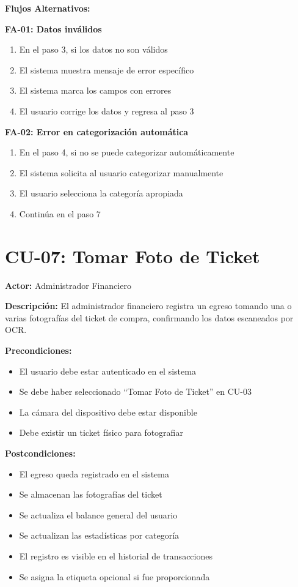 \noindent\textbf{Flujos Alternativos:}

\textbf{FA-01: Datos inválidos}
\begin{enumerate}
    \item En el paso 3, si los datos no son válidos
    \item El sistema muestra mensaje de error específico
    \item El sistema marca los campos con errores
    \item El usuario corrige los datos y regresa al paso 3
\end{enumerate}

\textbf{FA-02: Error en categorización automática}
\begin{enumerate}
    \item En el paso 4, si no se puede categorizar automáticamente
    \item El sistema solicita al usuario categorizar manualmente
    \item El usuario selecciona la categoría apropiada
    \item Continúa en el paso 7
\end{enumerate}

\section{CU-07: Tomar Foto de Ticket}

\noindent\textbf{Actor:} Administrador Financiero

\noindent\textbf{Descripción:} El administrador financiero registra un egreso tomando una o varias fotografías del ticket de compra, confirmando los datos escaneados por OCR.

\noindent\textbf{Precondiciones:}
\begin{itemize}
    \item El usuario debe estar autenticado en el sistema
    \item Se debe haber seleccionado ``Tomar Foto de Ticket'' en CU-03
    \item La cámara del dispositivo debe estar disponible
    \item Debe existir un ticket físico para fotografiar
\end{itemize}

\noindent\textbf{Postcondiciones:}
\begin{itemize}
    \item El egreso queda registrado en el sistema
    \item Se almacenan las fotografías del ticket
    \item Se actualiza el balance general del usuario
    \item Se actualizan las estadísticas por categoría
    \item El registro es visible en el historial de transacciones
    \item Se asigna la etiqueta opcional si fue proporcionada
\end{itemize}

